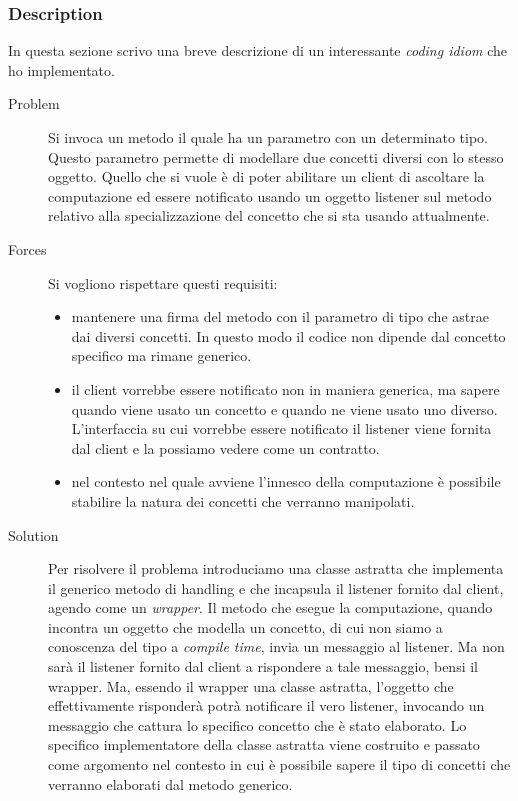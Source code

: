 \subsubsection*{Description}
In questa sezione scrivo una breve descrizione di un interessante
\emph{coding idiom} che ho implementato.
\begin{description}
\item[Problem] Si invoca un metodo il quale ha un parametro con un
  determinato tipo. Questo parametro permette di modellare due
  concetti diversi con lo stesso oggetto. Quello che si vuole \`e di
  poter abilitare un client di ascoltare la computazione ed essere
  notificato usando un oggetto listener sul metodo relativo alla
  specializzazione del concetto che si sta usando attualmente.
\item[Forces] Si vogliono rispettare questi requisiti:
  \begin{itemize}
  \item mantenere una firma del metodo con il parametro di tipo che
    astrae dai diversi concetti. In questo modo il codice non dipende
    dal concetto specifico ma rimane generico.
  \item il client vorrebbe essere notificato non in maniera generica,
    ma sapere quando viene usato un concetto e quando ne viene usato
    uno diverso. L'interfaccia su cui vorrebbe essere notificato il
    listener viene fornita dal client e la possiamo vedere come un
    contratto. 
  \item nel contesto nel quale avviene l'innesco della computazione
    \`e possibile stabilire la natura dei concetti che verranno
    manipolati.
  \end{itemize}
\item[Solution] Per risolvere il problema introduciamo una classe
  astratta che implementa il generico metodo di handling e che
  incapsula il listener fornito dal client, agendo come un
  \emph{wrapper}. Il metodo che esegue la computazione, quando
  incontra un oggetto che modella un concetto, di cui non siamo a
  conoscenza del tipo a \emph{compile time}, invia un messaggio al
  listener. Ma non sar\`a il listener fornito dal client a rispondere
  a tale messaggio, bensi il wrapper. Ma, essendo il wrapper una
  classe astratta, l'oggetto che effettivamente risponder\`a potr\`a
  notificare il vero listener, invocando un messaggio che cattura lo
  specifico concetto che \`e stato elaborato. Lo specifico
  implementatore della classe astratta viene costruito e passato come
  argomento nel contesto in cui \`e possibile sapere il tipo di
  concetti che verranno elaborati dal metodo generico.
\end{description}


